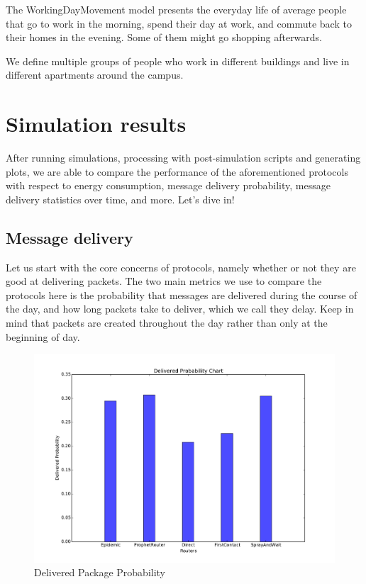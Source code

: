 \documentclass[conference]{IEEEtran}
\begin{document}
The WorkingDayMovement model presents the everyday life of average people that go to work in the morning, spend their day at work, and commute back to their homes in the evening. Some of them might go shopping afterwards.

We define multiple groups of people who work in different buildings and live in different apartments around the campus.

\section{Simulation results}

After running simulations, processing with post-simulation scripts and generating plots, we are able to compare the performance of the aforementioned protocols with respect to energy consumption, message delivery probability, message delivery statistics over time, and more. Let's dive in!

\subsection{Message delivery}

Let us start with the core concerns of protocols, namely whether or not they are good at delivering packets. The two main metrics we use to compare the protocols here is the probability that messages are delivered during the course of the day, and how long packets take to deliver, which we call they delay. Keep in mind that packets are created throughout the day rather than only at the beginning of day.

\begin{figure}
  \includegraphics[scale=0.25, center]{../one_1.5.1-RC2/plots/delivered_prob.pdf}
  \caption{Delivered Package Probability}
  \label{fig:delivered_prob}
\end{figure}
\end{document}
